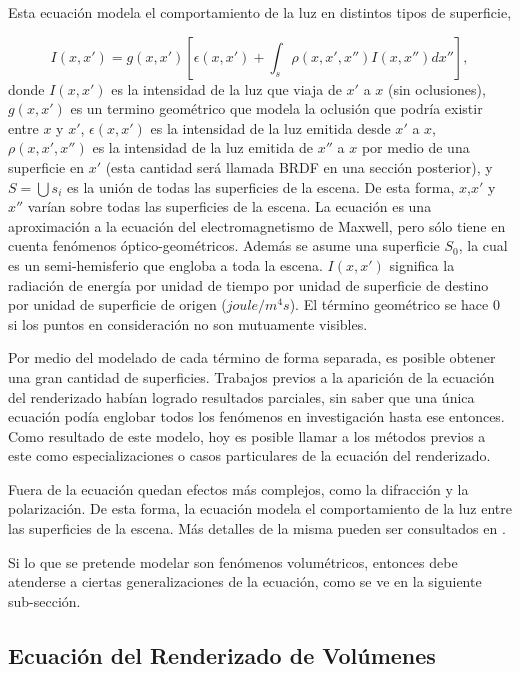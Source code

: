 Esta ecuación modela el comportamiento de la luz en distintos tipos de superficie,

\begin{equation}
I(x,x') =  g(x,x')  \left[ \epsilon(x,x') + \int_{s}{\rho(x,x',x'')I(x,x'') dx''} \right],
\end{equation}
donde $I(x,x')$ es la intensidad de la luz que viaja de $x'$ a $x$ (sin oclusiones), $g(x,x')$ es un termino geométrico que modela la oclusión que podría existir entre $x$ y $x'$, $\epsilon(x,x')$ es la intensidad de la luz emitida desde $x'$ a $x$, $\rho(x,x',x'')$ es la intensidad de la luz emitida de $x''$ a $x$ por medio de una superficie en $x'$ (esta cantidad será llamada BRDF en una sección posterior), y $S=\bigcup{s_{i}}$ es la unión de todas las superficies de la escena.
De esta forma, $x$,$x'$ y $x''$ varían sobre todas las superficies de la escena.
La ecuación es una aproximación a la ecuación del electromagnetismo de Maxwell, pero sólo tiene en cuenta fenómenos óptico-geométricos.
Además se asume una superficie $S_{0}$, la cual es un semi-hemisferio que engloba a toda la escena.
$I(x,x')$ significa la radiación de energía por unidad de tiempo por unidad de superficie de destino por unidad de superficie de origen ($joule/m^{4} s$).
El término geométrico se hace $0$ si los puntos en consideración no son mutuamente visibles.

Por medio del modelado de cada término de forma separada, es posible obtener una gran cantidad de superficies.
Trabajos previos a la aparición de la ecuación del renderizado habían logrado resultados parciales, sin saber que una única ecuación podía englobar todos los fenómenos en investigación hasta ese entonces.
Como resultado de este modelo, hoy es posible llamar a los métodos previos a este como especializaciones o casos particulares de la ecuación del renderizado.

Fuera de la ecuación quedan efectos más complejos, como la difracción y la polarización.
De esta forma, la ecuación modela el comportamiento de la luz entre las superficies de la escena.
Más detalles de la misma pueden ser consultados en \cite{Kajiya1986}.

Si lo que se pretende modelar son fenómenos volumétricos, entonces debe atenderse a ciertas generalizaciones de la ecuación, como se ve en la siguiente sub-sección.

\subsection{Ecuación del Renderizado de Volúmenes}

